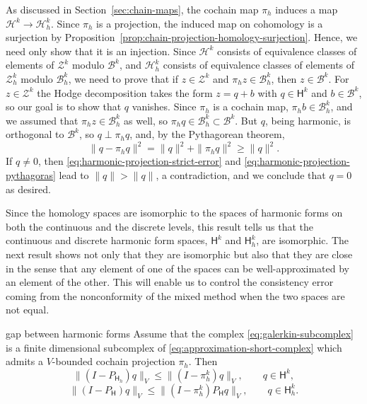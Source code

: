 \begin{Proof}
{As discussed in Section~\ref{sec:chain-maps}, the cochain map $\pi_h$ induces a map $\mathcal H^k\to\mathcal H_h^k$. Since $\pi_h$ is a projection, the induced map on cohomology is a surjection by Proposition~\ref{prop:chain-projection-homology-surjection}. Hence, we need only show that it is an injection. Since $\mathcal H^k$ consists of equivalence classes of elements of $\mathcal Z^k$ modulo $\mathcal B^k$, and $\mathcal H_h^k$ consists of equivalence classes of elements of $\mathcal Z_h^k$ modulo $\mathcal B_h^k$, we need to prove that if $z\in\mathcal Z^k$ and $\pi_hz\in\mathcal B_h^k$, then $z\in\mathcal B^k$. For $z\in\mathcal Z^k$ the Hodge decomposition takes the form $z=q+b$ with $q\in\mathsf H^k$ and $b\in\mathcal B^k$, so our goal is to show that $q$ vanishes. Since $\pi_h$ is a cochain map, $\pi_hb\in\mathcal B_h^k$, and we assumed that $\pi_hz\in\mathcal B_h^k$ as well, so $\pi_hq\in\mathcal B_h^k\subset\mathcal B^k$. But $q$, being harmonic, is orthogonal to $\mathcal B^k$, so $q\perp\pi_hq$, and, by the Pythagorean theorem,}
\begin{equation}\label{eq:harmonic-projection-pythagoras}
\|q-\pi_hq\|^2=\|q\|^2+\|\pi_hq\|^2\geq\|q\|^2.
\end{equation}
{If $q\ne0$, then \eqref{eq:harmonic-projection-strict-error} and \eqref{eq:harmonic-projection-pythagoras} lead to $\|q\|>\|q\|$, a contradiction, and we conclude that $q=0$ as desired.}
\end{Proof}

{Since the homology spaces are isomorphic to the spaces of harmonic forms on both the continuous and the discrete levels, this result tells us that the continuous and discrete harmonic form spaces, $\mathsf H^k$ and $\mathsf H_h^k$, are isomorphic. The next result shows not only that they are isomorphic but also that they are close in the sense that any element of one of the spaces can be well-approximated by an element of the other. This will enable us to control the consistency error coming from the nonconformity of the mixed method when the two spaces are not equal.}

\begin{Theorem}{{gap between harmonic forms}}\label{thm:harmonic-gap}
{Assume that the complex \eqref{eq:galerkin-subcomplex} is a finite dimensional subcomplex of \eqref{eq:approximation-short-complex} which admits a $V$-bounded cochain projection $\pi_h$. Then}
\begin{equation}\label{eq:harmonic-continuous-to-discrete-gap}
\|(I-P_{\mathsf H_h})q\|_V\leq\|(I-\pi_h^k)q\|_V,\qquad q\in\mathsf H^k,
\end{equation}
\begin{equation}\label{eq:harmonic-discrete-to-continuous-gap}
\|(I-P_{\mathsf H})q\|_V\leq\|(I-\pi_h^k)P_{\mathsf H}q\|_V,\qquad q\in\mathsf H_h^k.
\end{equation}
\end{Theorem}

